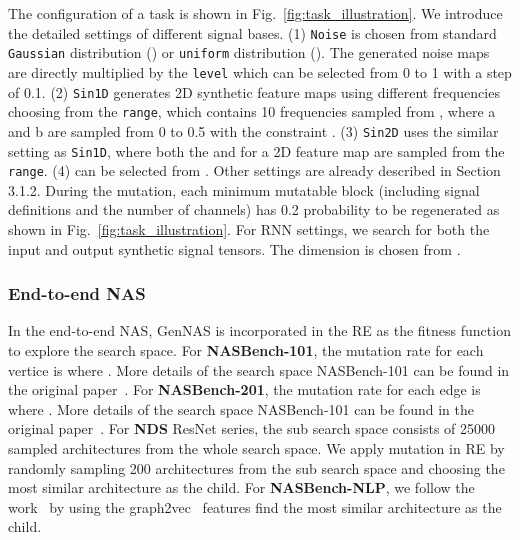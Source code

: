\documentclass{article}
\begin{document}
The configuration of a task is shown in Fig.~\ref{fig:task_illustration}. 
We introduce the detailed settings of different signal bases. 
(1) \texttt{Noise} is chosen from standard \texttt{Gaussian} distribution () or \texttt{uniform} distribution (). The generated noise maps are directly multiplied by the \texttt{level} which can be selected from 0 to 1 with a step of 0.1. (2) \texttt{Sin1D} generates 2D synthetic feature maps using different frequencies choosing from the \texttt{range}, which contains 10 frequencies sampled from , where a and b are sampled from 0 to 0.5 with the constraint . (3) \texttt{Sin2D} uses the similar setting as \texttt{Sin1D}, where both the  and  for a 2D feature map are sampled from the \texttt{range}. (4) {} can be selected from . Other settings are already described in Section 3.1.2. During the mutation, each minimum mutatable block (including signal definitions and the number of channels) has 0.2 probability to be regenerated as shown in Fig.~\ref{fig:task_illustration}. For RNN settings, we search for both the input and output synthetic signal tensors. The dimension  is chosen from .

\subsubsection{End-to-end NAS}
In the end-to-end NAS, GenNAS is incorporated in the RE as the fitness function to explore the search space. 
For \textbf{NASBench-101}, the mutation rate for each vertice is  where . More details of the search space NASBench-101 can be found in the original paper~\cite{ying2019bench}.
For \textbf{NASBench-201}, the mutation rate for each edge is  where . More details of the search space NASBench-101 can be found in the original paper~\cite{dong2020bench}.
For \textbf{NDS} ResNet series, the sub search space consists of 25000 sampled architectures from the whole search space. 
We apply mutation in RE by randomly sampling 200 architectures from the sub search space and choosing the most similar architecture as the child.
For \textbf{NASBench-NLP}, we follow the work~\cite{klyuchnikov2020bench} by using the graph2vec~\cite{narayanan2017graph2vec} features find the most similar architecture as the child. 
\end{document}
